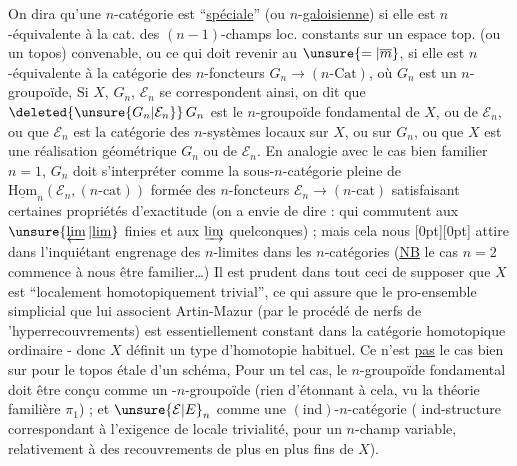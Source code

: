%
On dira qu'une $n$-catégorie  est ``\uline{spéciale}'' (ou $n$-\uline{galoisienne}) si elle est $n$-équivalente à la cat. des $(n-1)$-champs loc. constants sur un espace top. (ou un topos) convenable, ou ce qui doit revenir au $\unsure{=|\overline m}$, si elle est $n$-équivalente à la catégorie des $n$-foncteurs $G_n\longrightarrow(n\text{-}\mathrm{Cat})$, où $G_n$ est un $n$-groupoïde, Si $X$, $G_n$, $\mathcal E_n$ se correspondent ainsi, on dit que $\deleted{\unsure{G_n|\mathcal E_n}}\,G_n$ est le $n$-groupoïde fondamental de $X$, ou de $\mathcal E_n$, ou que $\mathcal E_n$ est la catégorie des $n$-systèmes locaux sur $X$, ou sur $G_n$, ou que $X$ est une réalisation géométrique  $G_n$ ou de $\mathcal E_n$. En analogie avec le cas bien familier $n=1$, $G_n$ doit s'interpréter comme la sous-$n$-catégorie pleine de $\underline{\mathrm{Hom}}_n(\mathcal E_n,(n\text{-}\mathrm{cat}))$ formée des $n$-foncteurs $\mathcal E_n\to(n\text{-}\mathrm{cat})$ satisfaisant certaines propriétés d'exactitude (on a envie de dire : qui commutent aux $\unsure{\varprojlim|\underline{\lim}}$ finies et aux $\varinjlim$ quelconques) ; mais cela nous
\raisebox{-1.8ex}[0pt][0pt]{}
 attire dans l'inquiétant engrenage des $n$-limites dans les $n$-catégories (\uline{NB} le cas $n=2$ commence à nous être familier\ldots) Il est prudent dans tout
%
ceci de supposer que $X$ est ``localement homotopiquement trivial'', ce qui assure que le pro-ensemble simplicial que lui associent Artin-Mazur (par le procédé de nerfs de 'hyperrecouvrements) est essentiellement constant dans la catégorie homotopique ordinaire - donc $X$ définit un type d'homotopie habituel. Ce n'est \uline{pas} le cas bien sur pour le topos étale d'un schéma, Pour un tel cas, le $n$-groupoïde fondamental doit être conçu comme un -$n$-groupoïde (rien d'étonnant à cela, vu la théorie familière  $\pi_1$) ; et $\unsure{\mathcal E|E}_n$ comme une $(\mathrm{ind})$-$n$-catégorie ( ind-structure correspondant à l'exigence de locale trivialité, pour un $n$-champ variable, relativement à des recouvrements de plus en plus fins de $X$).

